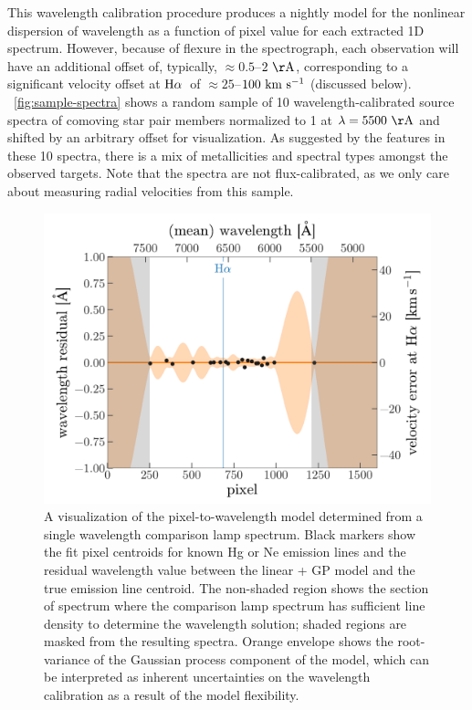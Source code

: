 \documentclass[modern, letterpaper]{aastex61}
\newcommand{\Ha}{\ensuremath{{\rm H}\alpha}}
\begin{document}
This wavelength calibration procedure produces a nightly model for the
nonlinear dispersion of wavelength as a function of pixel value for each
extracted 1D spectrum.
However, because of flexure in the spectrograph, each observation will have an
additional offset of, typically, $\approx 0.5$--$2~{\rm \AA}$, corresponding to
a significant velocity offset at \Ha\ of $\approx 25$--$100~\mathrm{km}~\mathrm{s}^{-1}$ (discussed
below).
\figurename~\ref{fig:sample-spectra} shows a random sample of 10
wavelength-calibrated source spectra of comoving star pair members normalized
to 1 at $\lambda = 5500~{\rm \AA}$ and shifted by an arbitrary offset for
visualization.
As suggested by the features in these 10 spectra, there is a mix of
metallicities and spectral types amongst the observed targets.
Note that the spectra are not flux-calibrated, as we only care about measuring
radial velocities from this sample.

\begin{figure}[htbp]
  \begin{center}
    \includegraphics[width=0.8\linewidth]{wavelength_gp.pdf}
  \end{center}
  \caption{%
    A visualization of the pixel-to-wavelength model determined from a single
    wavelength comparison lamp spectrum.
    Black markers show the fit pixel centroids for known Hg or Ne emission
    lines and the residual wavelength value between the linear + GP model and
    the true emission line centroid.
    The non-shaded region shows the section of spectrum where the comparison
    lamp spectrum has sufficient line density to determine the wavelength
    solution; shaded regions are masked from the resulting spectra.
    Orange envelope shows the root-variance of the Gaussian process component
    of the model, which can be interpreted as inherent uncertainties on the
    wavelength calibration as a result of the model flexibility.
    \label{fig:wavelength-GP}}
\end{figure}
\end{document}
